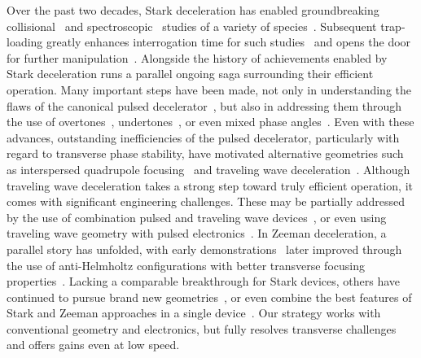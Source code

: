 \documentclass[%
 reprint,
 amsmath,amssymb,
 aps,
prl,
]{revtex4-1}
\begin{document}
Over the past two decades, Stark deceleration has enabled groundbreaking collisional~\cite{Sawyer2011,Kirste2012,Gao2018} and spectroscopic~\cite{Veldhoven2004,Hudson2006,Lev2006,Fast2018} studies of a variety of species~\cite{VanDeMeerakker2012}. 
Subsequent trap-loading greatly enhances interrogation time for such studies~\cite{Sawyer2008} and opens the door for further manipulation~\cite{Reens2017}. 
Alongside the history of achievements enabled by Stark deceleration runs a parallel ongoing saga surrounding their efficient operation. 
Many important steps have been made, not only in understanding the flaws of the canonical pulsed decelerator~\cite{VanDeMeerakker2006,Sawyer2008a}, but also in addressing them through the use of overtones~\cite{VanDeMeerakker2005a,Scharfenberg2009}, undertones~\cite{Zhang2016}, or even mixed phase angles~\cite{Parazzoli2009,Hou2013}. 
Even with these advances, outstanding inefficiencies of the pulsed decelerator, particularly with regard to transverse phase stability, have motivated alternative geometries such as interspersed quadrupole focusing~\cite{Sawyer2008a} and traveling wave deceleration~\cite{Osterwalder2010,VandenBerg2014,Fabrikant2014}.
Although traveling wave deceleration takes a strong step toward truly efficient operation, it comes with significant engineering challenges. 
These may be partially addressed by the use of combination pulsed and traveling wave devices~\cite{Quintero-Perez2013}, or even using traveling wave geometry with pulsed electronics~\cite{Hou2016,Shyur2017}. 
In Zeeman deceleration, a parallel story has unfolded, with early demonstrations~\cite{Vanhaecke2007,Narevicius2008} later improved through the use of anti-Helmholtz configurations with better transverse focusing properties~\cite{LavertOfir2011,Dulitz2014}.
Lacking a comparable breakthrough for Stark devices, others have continued to pursue brand new geometries~\cite{Wang2016}, or even combine the best features of Stark and Zeeman approaches in a single device~\cite{Cremers2017,Plomp2019}.
Our strategy works with conventional geometry and electronics, but fully resolves transverse challenges and offers gains even at low speed.
\end{document}
